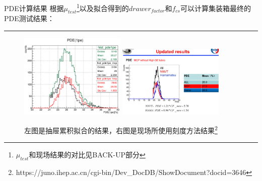 \documentclass[11pt,compress,xcolor=x11names,UTF8]{beamer}
\begin{document}
\begin{frame}{PDE计算结果}
根据$\mu_{test}$\footnote{$\mu_{test}$和现场结果的对比见BACK-UP部分}以及拟合得到的$drawer_{factor}$和$f_{cs}$可以计算集装箱最终的PDE测试结果：
\hrule{\textwidth}
\begin{figure}
\centering
\includegraphics[width=0.45\textwidth]{pde_res}
\includegraphics[width=0.45\textwidth]{hqpde}
\caption{左图是抽屉累积拟合的结果，右图是现场所使用刻度方法结果\footnote{https://juno.ihep.ac.cn/cgi-bin/Dev\_DocDB/ShowDocument?docid=3646}}
\end{figure}

\end{frame}
\end{document}
